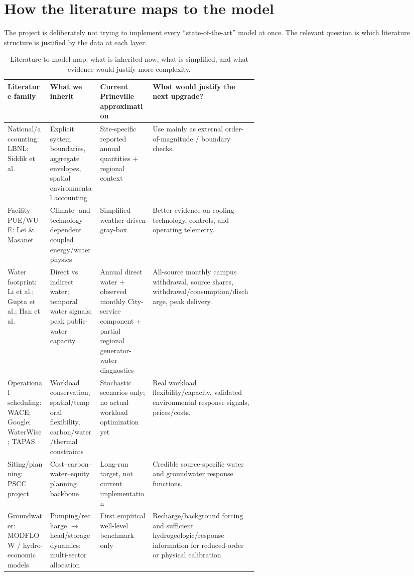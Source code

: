 \documentclass[11pt]{article}
\begin{document}
\section{How the literature maps to the model}

The project is deliberately not trying to implement every ``state-of-the-art'' model at once. The relevant question is which literature structure is justified by the data at each layer.

\begin{table}[ht]
\centering
\scriptsize
\begin{tabularx}{\linewidth}{@{}p{0.17\linewidth}p{0.20\linewidth}p{0.21\linewidth}Y@{}}
\toprule
\textbf{Literature family} & \textbf{What we inherit} & \textbf{Current Prineville approximation} & \textbf{What would justify the next upgrade?} \\
\midrule
National/accounting: LBNL; Siddik et al. & Explicit system boundaries, aggregate envelopes, spatial environmental accounting & Site-specific reported annual quantities + regional context & Use mainly as external order-of-magnitude / boundary checks. \\
Facility PUE/WUE: Lei \& Masanet & Climate- and technology-dependent coupled energy/water physics & Simplified weather-driven gray-box & Better evidence on cooling technology, controls, and operating telemetry. \\
Water footprint: Li et al.; Gupta et al.; Han et al. & Direct vs indirect water; temporal water signals; peak public-water capacity & Annual direct water + observed monthly City-service component + partial regional generator-water diagnostics & All-source monthly campus withdrawal, source shares, withdrawal/consumption/discharge, peak delivery. \\
Operational scheduling: WACE; Google; WaterWise; TAPAS & Workload conservation, spatial/temporal flexibility, carbon/water/thermal constraints & Stochastic scenarios only; no actual workload optimization yet & Real workload flexibility/capacity, validated environmental response signals, prices/costs. \\
Siting/planning: PSCC project & Cost--carbon--water--equity planning backbone & Long-run target, not current implementation & Credible source-specific water and groundwater response functions. \\
Groundwater: MODFLOW / hydro-economic models & Pumping/recharge \(\rightarrow\) head/storage dynamics; multi-sector allocation & First empirical well-level benchmark only & Recharge/background forcing and sufficient hydrogeologic/response information for reduced-order or physical calibration. \\
\bottomrule
\end{tabularx}
\caption{Literature-to-model map: what is inherited now, what is simplified, and what evidence would justify more complexity.}
\end{table}
\end{document}

